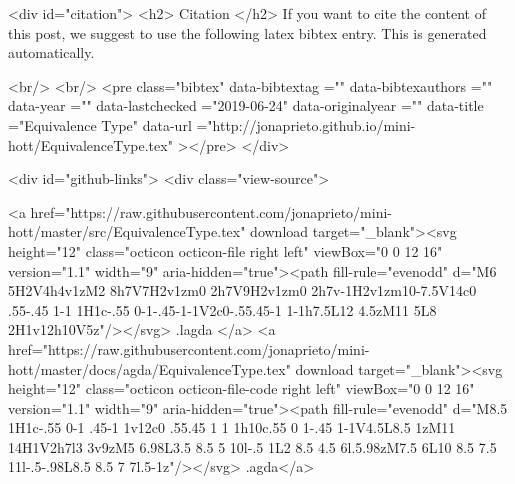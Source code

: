   
  <div id="citation">
  <h2> Citation </h2>
  If you want to cite the content of this post,
  we suggest to use the following latex bibtex entry.
  This is generated automatically.

  <br/>
  <br/>
  <pre class="bibtex"
       data-bibtextag =""
       data-bibtexauthors =""
       data-year =""
       data-lastchecked ="2019-06-24"
       data-originalyear =""
       data-title ="Equivalence Type"
       data-url ="http://jonaprieto.github.io/mini-hott/EquivalenceType.tex"
  ></pre>
  </div>
  

  <div id="github-links">
    <div class="view-source">
      
        <a href="https://raw.githubusercontent.com/jonaprieto/mini-hott/master/src/EquivalenceType.tex" download target="_blank"><svg height="12" class="octicon octicon-file right left" viewBox="0 0 12 16" version="1.1" width="9" aria-hidden="true"><path fill-rule="evenodd" d="M6 5H2V4h4v1zM2 8h7V7H2v1zm0 2h7V9H2v1zm0 2h7v-1H2v1zm10-7.5V14c0 .55-.45 1-1 1H1c-.55 0-1-.45-1-1V2c0-.55.45-1 1-1h7.5L12 4.5zM11 5L8 2H1v12h10V5z"/></svg> .lagda </a>
        <a href="https://raw.githubusercontent.com/jonaprieto/mini-hott/master/docs/agda/EquivalenceType.tex" download target="_blank"><svg height="12" class="octicon octicon-file-code right left" viewBox="0 0 12 16" version="1.1" width="9" aria-hidden="true"><path fill-rule="evenodd" d="M8.5 1H1c-.55 0-1 .45-1 1v12c0 .55.45 1 1 1h10c.55 0 1-.45 1-1V4.5L8.5 1zM11 14H1V2h7l3 3v9zM5 6.98L3.5 8.5 5 10l-.5 1L2 8.5 4.5 6l.5.98zM7.5 6L10 8.5 7.5 11l-.5-.98L8.5 8.5 7 7l.5-1z"/></svg> .agda</a>
      

